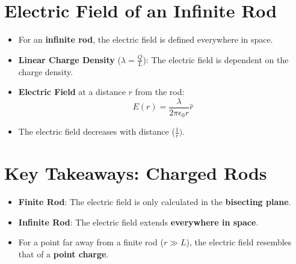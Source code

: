 \documentclass{article}
\begin{document}
\section*{Electric Field of an Infinite Rod}
\begin{itemize}
    \item For an \textbf{infinite rod}, the electric field is defined everywhere in space.
    \item \textbf{Linear Charge Density} (\(\lambda = \frac{Q}{L}\)): The electric field is dependent on the charge density.
    \item \textbf{Electric Field} at a distance \(r\) from the rod:
    \[
    E(r) = \frac{\lambda}{2 \pi \epsilon_0 r} \hat{r}
    \]
    \item The electric field decreases with distance (\(\frac{1}{r})\).
\end{itemize}

\section*{Key Takeaways: Charged Rods}
\begin{itemize}
    \item \textbf{Finite Rod}: The electric field is only calculated in the \textbf{bisecting plane}.
    \item \textbf{Infinite Rod}: The electric field extends \textbf{everywhere in space}.
    \item For a point far away from a finite rod (\(r \gg L\)), the electric field resembles that of a \textbf{point charge}.
\end{itemize}
\end{document}

